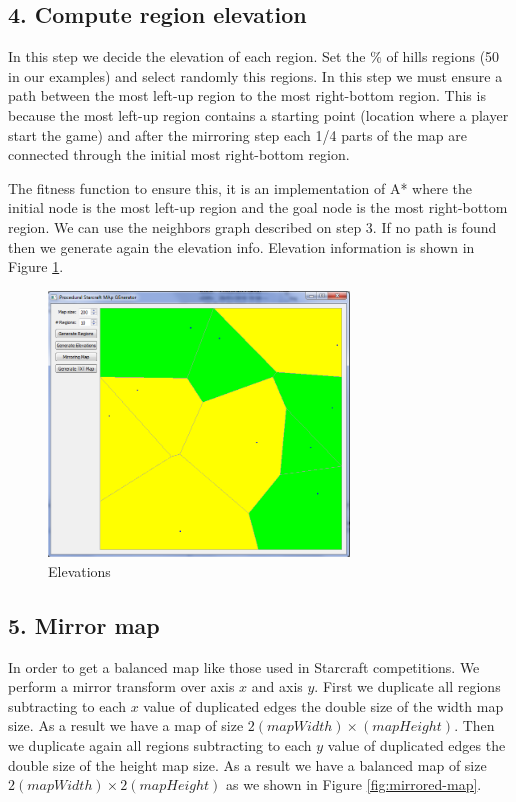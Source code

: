 \documentclass[letterpaper]{article}
\begin{document}
\subsection{4. Compute region elevation}
In this step we decide the elevation of each region. Set the \% of hills regions (50 in our examples) and select randomly this regions. In this step we must ensure a path between the most left-up region to the most right-bottom region. This is because the most left-up region contains a starting point (location where a player start the game) and after the mirroring step each 1/4 parts of the map are connected through the initial most right-bottom region.

The fitness function to ensure this, it is an implementation of A* where the initial node is the most left-up region and the goal node is the most right-bottom region. We can use the neighbors graph described on step 3. If no path is found then we generate again the elevation info. Elevation information is shown in Figure \ref{fig:elevations}.

\begin{figure}[h]
    \centering
    \includegraphics[width=8cm]{PCG03.png}
    \caption{Elevations}
    \label{fig:elevations}
\end{figure}

\subsection{5. Mirror map}
In order to get a balanced map like those used in Starcraft competitions. We perform a mirror transform over axis $x$ and axis $y$. First we duplicate all regions subtracting to each $x$ value of duplicated edges the double size of the width map size. As a result we have a map of size $2(mapWidth) \times (mapHeight)$. Then we duplicate again all regions subtracting to each $y$ value of duplicated edges the double size of the height map size. As a result we have a balanced map of size $2(mapWidth)  \times 2(mapHeight)$ as we shown in Figure \ref{fig:mirrored-map}.
\end{document}

